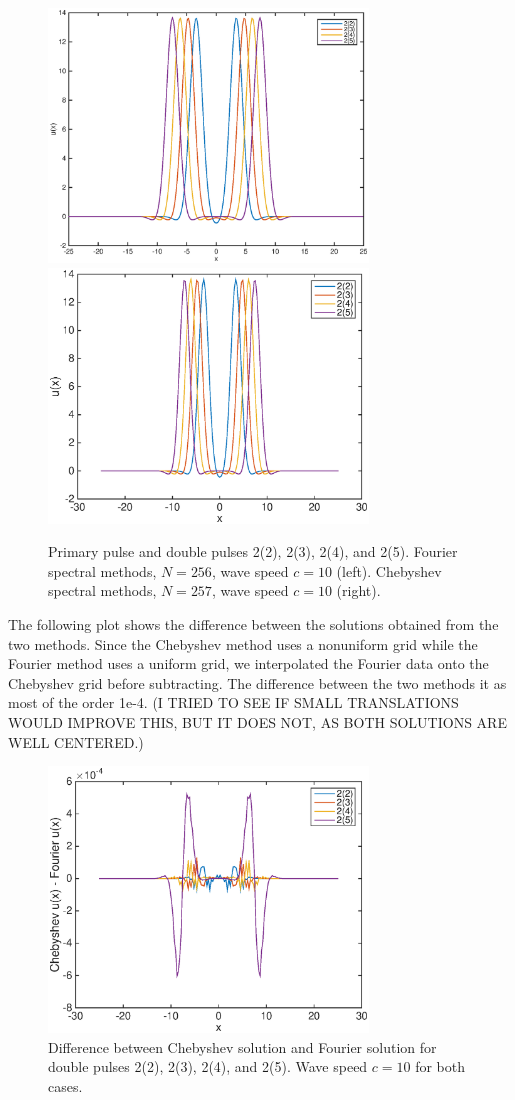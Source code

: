\documentclass[12pt]{article}
\begin{document}
\begin{figure}[H]
	\includegraphics[width=8.5cm]{four10double.eps}
	\includegraphics[width=8.5cm]{cheb10double}
	\caption{Primary pulse and double pulses 2(2), 2(3), 2(4), and 2(5). Fourier spectral methods, $N = 256$, wave speed $c = 10$ (left). Chebyshev spectral methods, $N = 257$, wave speed $c = 10$ (right). }
\end{figure}

The following plot shows the difference between the solutions obtained from the two methods. Since the Chebyshev method uses a nonuniform grid while the Fourier method uses a uniform grid, we interpolated the Fourier data onto the Chebyshev grid before subtracting. The difference between the two methods it as most of the order 1e-4. (I TRIED TO SEE IF SMALL TRANSLATIONS WOULD IMPROVE THIS, BUT IT DOES NOT, AS BOTH SOLUTIONS ARE WELL CENTERED.)

\begin{figure}[H]
	\includegraphics[width=8.5cm]{chebfourdiff.eps}
	\caption{Difference between Chebyshev solution and Fourier solution for double pulses 2(2), 2(3), 2(4), and 2(5). Wave speed $c = 10$ for both cases.}
\end{figure}
\end{document}
